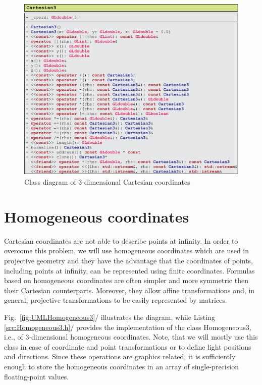 \documentclass[b5paper, twosided]{book}
\newcommand{\blue}[1]{{\color[rgb]{0.0, 0.0, 0.75}#1}}
\DeclareRobustCommand{\mref}[1]{\ref{#1}{\relsize{-1}/\pageref{#1}}}
\begin{document}
\begin{figure}[!h]
	\centering
	\includegraphics[]{images/UMLCartesian3.pdf}
	\caption{Class diagram of $3$-dimensional Cartesian coordinates}
	\label{fig:UMLCartesian3}
\end{figure}

\newpage{}


\section{Homogeneous coordinates}

Cartesian coordinates are not able to describe points at infinity. In order to overcome this problem, we will use homogeneous coordinates which are used in projective geometry and they have the advantage that the coordinates of points, including points at infinity, can be represented using finite coordinates. Formulas based on homogeneous coordinates are often simpler and more symmetric then their Cartesian counterparts. Moreover, they allow affine transformations and, in general, projective transformations to be easily represented by matrices.

Fig.\ \mref{fig:UMLHomogeneous3} illustrates the diagram, while Listing \mref{src:Homogeneous3.h} provides the implementation of the class \blue{Homogeneous3}, i.e., of $3$-dimensional homogeneous coordinates. Note, that we will mostly use this class in case of coordinate and point transformations or to define light positions and directions. Since these operations are graphics related, it is sufficiently enough to store the homogeneous coordinates in an array of single-precision floating-point values.
\end{document}
